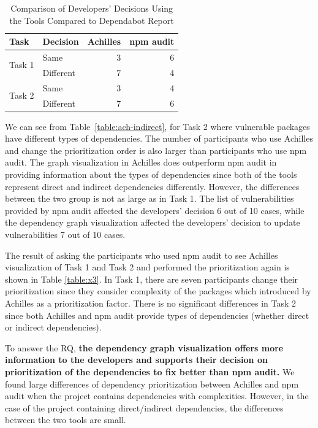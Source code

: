 \documentclass[conference]{IEEEtran}
\begin{document}
	
	\begin{table}[tb]
		\centering
		\caption{Comparison of Developers' Decisions Using the Tools Compared to Dependabot Report}
		\begin{tabular}{llrr}
			\toprule
			Task & Decision & Achilles & npm audit \\
			\midrule
			\multirow{2}{*}{Task 1} & Same & 3 & 6 \\ 
			& Different & 7 & 4 \\ \midrule
			\multirow{2}{*}{Task 2} & Same & 3 & 4 \\ 
			& Different & 7 & 6 \\
			\bottomrule
		\end{tabular}
		\label{table:compare-ach}
	\end{table}

We can see from Table~\ref{table:ach-indirect}, for Task 2 where vulnerable packages have different types of dependencies. The number of participants who use Achilles and change the prioritization order is also larger than participants who use npm audit. The graph visualization in Achilles does outperform npm audit in providing information about the types of dependencies since both of the tools represent direct and indirect dependencies differently. However, the differences between the two group is not as large as in Task 1. The list of vulnerabilities provided by npm audit affected the developers' decision 6 out of 10 cases, while the dependency graph visualization affected the developers' decision to update vulnerabilities 7 out of 10 cases.

The result of asking the participants who used npm audit to see Achilles visualization of Task 1 and Task 2 and performed the prioritization again is shown in Table \ref{table:x3}. In Task 1, there are seven participants change their prioritization since they consider complexity of the packages which introduced by Achilles as a prioritization factor. There is no significant differences in Task 2 since both Achilles and npm audit provide types of dependencies (whether direct or indirect dependencies).

To answer the RQ, \textbf{the dependency graph visualization offers more information to the developers and supports their decision on prioritization of the dependencies to fix better than npm audit.} We found large differences of dependency prioritization between Achilles and npm audit when the project contains dependencies with complexities. However, in the case of the project containing direct/indirect dependencies, the differences between the two tools are small.
\end{document}
